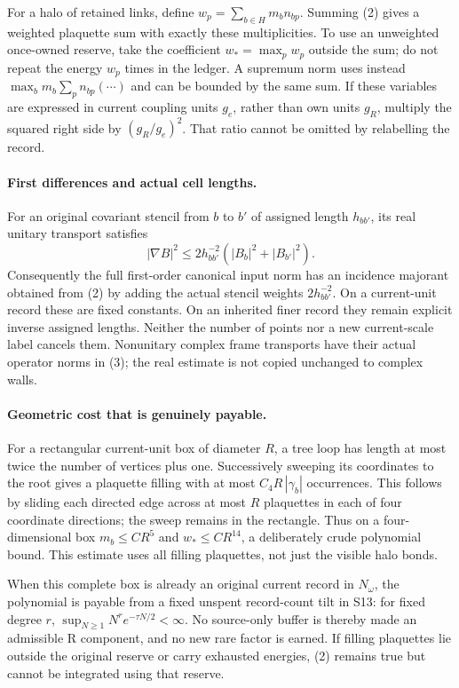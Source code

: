 \documentclass{article}
\begin{document}
For a halo of retained links, define $w_p=\sum_{b\in H}m_bn_{bp}$. Summing (2) gives a weighted plaquette sum with exactly these multiplicities. To use an unweighted once-owned reserve, take the coefficient $w_* =\max_p w_p$ outside the sum; do not repeat the energy $w_p$ times in the ledger. A supremum norm uses instead $\max_bm_b\sum_pn_{bp}(\cdots)$ and can be bounded by the same sum. If these variables are expressed in current coupling units $g_e$, rather than own units $g_R$, multiply the squared right side by $(g_R/g_e)^2$. That ratio cannot be omitted by relabelling the record.

\paragraph{First differences and actual cell lengths.}
For an original covariant stencil from $b$ to $b'$ of assigned length $h_{bb'}$, its real unitary transport satisfies
\[
 |\nabla B|^2\le 2h_{bb'}^{-2}(|B_b|^2+|B_{b'}|^2).       \tag{3}
\]
Consequently the full first-order canonical input norm has an incidence majorant obtained from (2) by adding the actual stencil weights $2h_{bb'}^{-2}$. On a current-unit record these are fixed constants. On an inherited finer record they remain explicit inverse assigned lengths. Neither the number of points nor a new current-scale label cancels them. Nonunitary complex frame transports have their actual operator norms in (3); the real estimate is not copied unchanged to complex walls.

\paragraph{Geometric cost that is genuinely payable.}
For a rectangular current-unit box of diameter $R$, a tree loop has length at most twice the number of vertices plus one. Successively sweeping its coordinates to the root gives a plaquette filling with at most $C_4R\,|\gamma_b|$ occurrences. This follows by sliding each directed edge across at most $R$ plaquettes in each of four coordinate directions; the sweep remains in the rectangle. Thus on a four-dimensional box $m_b\le C R^5$ and $w_*\le C R^{14}$, a deliberately crude polynomial bound. This estimate uses all filling plaquettes, not just the visible halo bonds.

When this complete box is already an original current record in $N_\omega$, the polynomial is payable from a fixed unspent record-count tilt in S13: for fixed degree $r$, $\sup_{N\ge1}N^r e^{-\tau N/2}<\infty$. No source-only buffer is thereby made an admissible R component, and no new rare factor is earned. If filling plaquettes lie outside the original reserve or carry exhausted energies, (2) remains true but cannot be integrated using that reserve.
\end{document}
